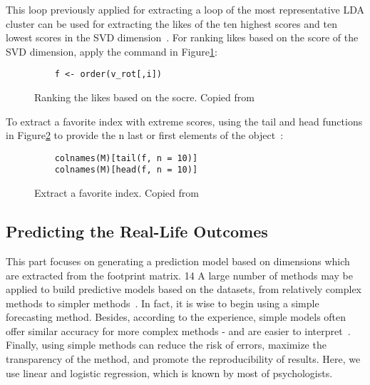 This loop previously applied for extracting a loop of the most 
representative LDA cluster can be used for extracting the likes 
of the ten highest scores and ten lowest scores in the SVD 
dimension~\cite{hid515-12}.
 For ranking likes based on the score of the SVD dimension, 
apply the command in Figure\ref{F:rank}:

\begin{figure}[htb]
\begin{footnotesize}
\begin{verbatim}
    f <- order(v_rot[,i])
\end{verbatim}
\end{footnotesize}
\caption{Ranking the likes based on the socre. 
Copied from~\cite{hid515-12}}
\label{F:rank}
\end{figure}


To extract a favorite index with extreme scores, using the tail 
and head functions in Figure\ref{F:extractindex} to provide the n last or 
first elements of the 
object~\cite{hid515-12}:

\begin{figure}[htb]
\begin{footnotesize}
\begin{verbatim}
    colnames(M)[tail(f, n = 10)]
    colnames(M)[head(f, n = 10)]
\end{verbatim}
\end{footnotesize}
\caption{Extract a favorite index. Copied from~\cite{hid515-12}}
\label{F:extractindex}
\end{figure}


\subsection{Predicting the Real-Life Outcomes~\cite{hid515-12}}

This part focuses on generating a prediction model based on 
dimensions which are extracted from the footprint matrix.
 14 A large number of methods may be applied to build predictive 
models based on the datasets, from relatively complex methods to 
simpler methods~\cite{hid515-12}. 
In fact, it is wise to begin using a 
simple forecasting method. Besides, according to the 
experience, simple models often offer similar accuracy for more complex 
methods - and are easier to interpret~\cite{hid515-12}. 
Finally, using simple methods can reduce the
 risk of errors, maximize the transparency of the method, and 
promote the reproducibility of results. Here, we use linear
 and logistic regression, which is known by most of psychologists.


